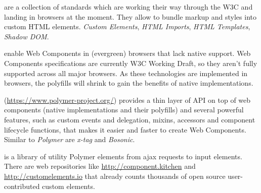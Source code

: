 \begin{description}
\itemsep1pt\parskip0pt
        \item[Web Components] are a collection of standards which are working their way through the W3C and landing in browsers at the moment. They allow to bundle markup and styles into custom HTML elements.
\emph{Custom Elements}\cite{custom-elements}, \emph{HTML Imports}\cite{html-imports}, \emph{HTML Templates}\cite{html-templates}, \emph{Shadow DOM}\cite{shadow-dom}.
        \item[webcomponent.js polyfills] enable Web Components in (evergreen) browsers that lack native support.
Web Components specifications are currently W3C Working Draft, so they aren’t fully supported across all major browsers.
As these technologies are implemented in browsers, the polyfills will shrink to gain the benefits of native implementations. \cite{webcomponents-polyfills} 
        \item[Polymer library] (\url{https://www.polymer-project.org/}) provides a thin layer of API on top of web components (native implementations and their polyfills) and several powerful features, such as custom events and delegation, mixins, accessors and component lifecycle functions, that makes it easier and faster to create Web Components. Similar to \emph{Polymer} are \emph{x-tag} and \emph{Bosonic}.
        \item[iron-elements] \cite{iron-elements} is a library of utility Polymer elements from ajax requests to input elements. 
There are web repositories like \url{http://component.kitchen} and \url{http://customelements.io} that already counts thousands of open source user-contributed custom elements.
\end{description}


 
